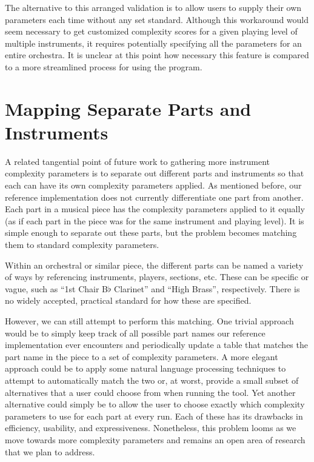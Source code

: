 \documentclass[12pt]{report}
\begin{document}
The alternative to this arranged validation is to allow users to supply their own parameters each time without any set standard. Although this workaround would seem necessary to get customized complexity scores for a given playing level of multiple instruments, it requires potentially specifying all the parameters for an entire orchestra. It is unclear at this point how necessary this feature is compared to a more streamlined process for using the program.

\section{Mapping Separate Parts and Instruments}
\label{sec:partinstruments}

A related tangential point of future work to gathering more instrument complexity parameters is to separate out different parts and instruments so that each can have its own complexity parameters applied. As mentioned before, our reference implementation does not currently differentiate one part from another. Each part in a musical piece has the complexity parameters applied to it equally (as if each part in the piece was for the same instrument and playing level). It is simple enough to separate out these parts, but the problem becomes matching them to standard complexity parameters.

Within an orchestral or similar piece, the different parts can be named a variety of ways by referencing instruments, players, sections, etc. These can be specific or vague, such as ``1st Chair B$\flat$ Clarinet'' and ``High Brass'', respectively. There is no widely accepted, practical standard for how these are specified.

However, we can still attempt to perform this matching. One trivial approach would be to simply keep track of all possible part names our reference implementation ever encounters and periodically update a table that matches the part name in the piece to a set of complexity parameters. A more elegant approach could be to apply some natural language processing techniques to attempt to automatically match the two or, at worst, provide a small subset of alternatives that a user could choose from when running the tool. Yet another alternative could simply be to allow the user to choose exactly which complexity parameters to use for each part at every run. Each of these has its drawbacks in efficiency, usability, and expressiveness. Nonetheless, this problem looms as we move towards more complexity parameters and remains an open area of research that we plan to address.
\end{document}

